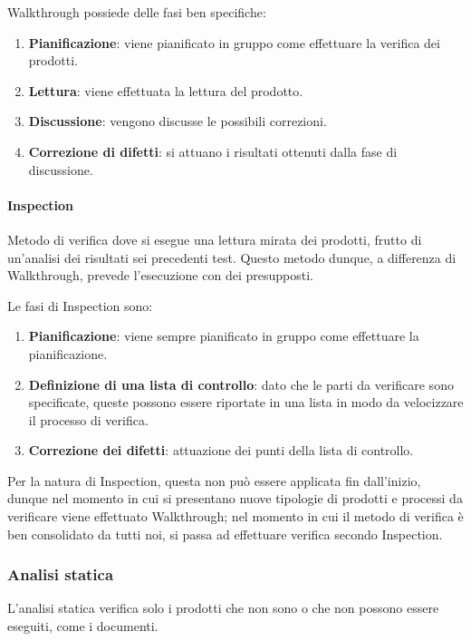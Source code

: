 			Walkthrough possiede delle fasi ben specifiche:

			\begin{enumerate}
				\item \textbf{Pianificazione}: viene pianificato in gruppo come effettuare la verifica dei prodotti.
				\item \textbf{Lettura}: viene effettuata la lettura del prodotto.
				\item \textbf{Discussione}: vengono discusse le possibili correzioni.
				\item \textbf{Correzione di difetti}: si attuano i risultati ottenuti dalla fase di discussione.
			\end{enumerate}

			\paragraph{Inspection}
			Metodo di verifica dove si esegue una lettura mirata dei prodotti, frutto di un'analisi dei risultati sei precedenti test.
			Questo metodo dunque, a differenza di Walkthrough, prevede l'esecuzione con dei presupposti.
	
			Le fasi di Inspection sono:
	
			\begin{enumerate}
				\item \textbf{Pianificazione}: viene sempre pianificato in gruppo come effettuare la pianificazione.
				\item \textbf{Definizione di una lista di controllo}: dato che le parti da verificare sono specificate, queste possono essere
				riportate in una lista in modo da velocizzare il processo di verifica.
				\item \textbf{Correzione dei difetti}: attuazione dei punti della lista di controllo.
			\end{enumerate}
	
			Per la natura di Inspection, questa non può essere applicata fin dall'inizio, dunque nel momento in cui si presentano nuove tipologie di
			prodotti e processi da verificare viene effettuato Walkthrough; nel momento in cui il metodo di verifica è ben consolidato da tutti noi,
			si passa ad effettuare verifica secondo Inspection.		

		\subsubsection{Analisi statica}
		L'analisi statica verifica solo i prodotti che non sono o che non possono essere eseguiti, come i documenti.

